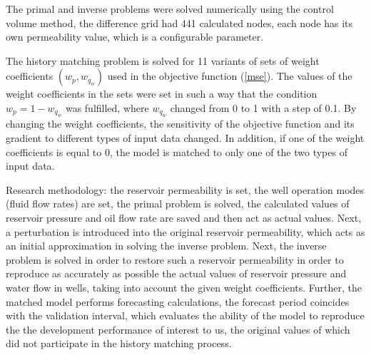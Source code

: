 \documentclass[
11pt,%
tightenlines,%
twoside,%
onecolumn,%
nofloats,%
nobibnotes,%
nofootinbib,%
superscriptaddress,%
noshowpacs,%
centertags]%
{revtex4}
\begin{document}
The primal and inverse problems were solved numerically using the
control volume method, the difference grid had 441 calculated nodes,
each node has its own permeability value, which is a configurable
parameter.

The history matching problem is solved for 11 variants of sets of
weight coefficients $(w_p, w_{q_w})$ used in the objective function
({\ref{mse}}). The values of the weight coefficients in the sets were
set in such a way that the condition $w_p = 1 - w_{q_w}$ was
fulfilled, where $w_{q_w}$ changed from 0 to 1 with a step of 0.1.
By changing the weight coefficients, the sensitivity of the
objective function and its gradient to different types of input data
changed. In addition, if one of the weight coefficients is equal to
0, the model is matched to only one of the two types of input data.

Research methodology: the reservoir permeability is set, the well
operation modes (fluid flow rates) are set, the primal problem is
solved, the calculated values of reservoir pressure and oil flow
rate are saved and then act as actual values. Next, a perturbation
is introduced into the original reservoir permeability, which acts as an
initial approximation in solving the inverse problem. Next, the
inverse problem is solved in order to restore such a reservoir permeability
in order to reproduce as accurately as possible the actual
values of reservoir pressure and water flow in wells, taking into
account the given weight coefficients. Further, the matched model
performs forecasting calculations, the forecast period coincides with
the validation interval, which evaluates the ability of the model to
reproduce the the development performance of interest to us, the original values of
which did not participate in the history matching process.
\end{document}
